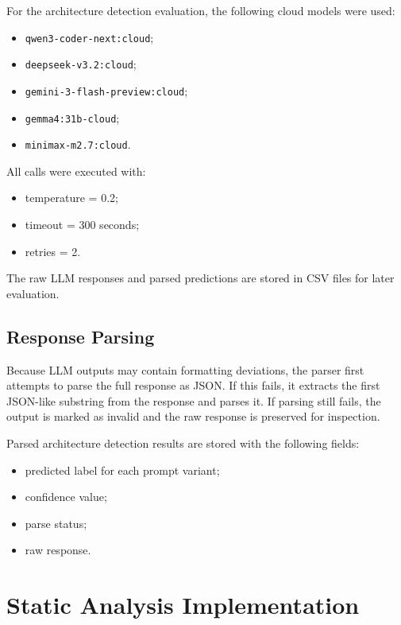 For the architecture detection evaluation, the following cloud models were used:

\begin{itemize}
    \item \texttt{qwen3-coder-next:cloud};
    \item \texttt{deepseek-v3.2:cloud};
    \item \texttt{gemini-3-flash-preview:cloud};
    \item \texttt{gemma4:31b-cloud};
    \item \texttt{minimax-m2.7:cloud}.
\end{itemize}

All calls were executed with:

\begin{itemize}
    \item temperature = 0.2;
    \item timeout = 300 seconds;
    \item retries = 2.
\end{itemize}

The raw LLM responses and parsed predictions are stored in CSV files for later evaluation.

\subsection{Response Parsing}

Because LLM outputs may contain formatting deviations, the parser first attempts to parse the full response as JSON. If this fails, it extracts the first JSON-like substring from the response and parses it. If parsing still fails, the output is marked as invalid and the raw response is preserved for inspection.

Parsed architecture detection results are stored with the following fields:

\begin{itemize}
    \item predicted label for each prompt variant;
    \item confidence value;
    \item parse status;
    \item raw response.
\end{itemize}

\section{Static Analysis Implementation}

